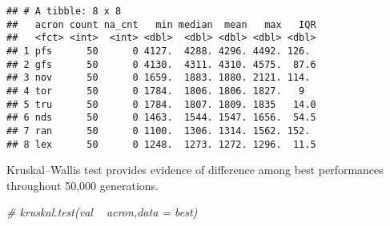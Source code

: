 \documentclass[]{book}
\newenvironment{Shaded}{\begin{snugshade}}{\end{snugshade}}
\newcommand{\CommentTok}[1]{\textcolor[rgb]{0.56,0.35,0.01}{\textit{#1}}}
\newcommand{\DataTypeTok}[1]{\textcolor[rgb]{0.13,0.29,0.53}{#1}}
\newcommand{\KeywordTok}[1]{\textcolor[rgb]{0.13,0.29,0.53}{\textbf{#1}}}
\newcommand{\NormalTok}[1]{#1}
\newcommand{\OperatorTok}[1]{\textcolor[rgb]{0.81,0.36,0.00}{\textbf{#1}}}
\newcommand{\OtherTok}[1]{\textcolor[rgb]{0.56,0.35,0.01}{#1}}
\newcommand{\StringTok}[1]{\textcolor[rgb]{0.31,0.60,0.02}{#1}}
\begin{document}
\begin{Shaded}
\end{Shaded}

\begin{verbatim}
## # A tibble: 8 x 8
##   acron count na_cnt   min median  mean   max   IQR
##   <fct> <int>  <int> <dbl>  <dbl> <dbl> <dbl> <dbl>
## 1 pfs      50      0 4127.  4288. 4296. 4492. 126. 
## 2 gfs      50      0 4130.  4311. 4310. 4575.  87.6
## 3 nov      50      0 1659.  1883. 1880. 2121. 114. 
## 4 tor      50      0 1784.  1806. 1806. 1827.   9  
## 5 tru      50      0 1784.  1807. 1809. 1835   14.0
## 6 nds      50      0 1463.  1544. 1547. 1656.  54.5
## 7 ran      50      0 1100.  1306. 1314. 1562. 152. 
## 8 lex      50      0 1248.  1273. 1272. 1296.  11.5
\end{verbatim}

Kruskal--Wallis test provides evidence of difference among best performances throughout 50,000 generations.

\begin{Shaded}
\begin{Highlighting}[]
\CommentTok{# kruskal.test(val ~ acron,data = best)}
\end{Highlighting}
\end{Shaded}
\end{document}
